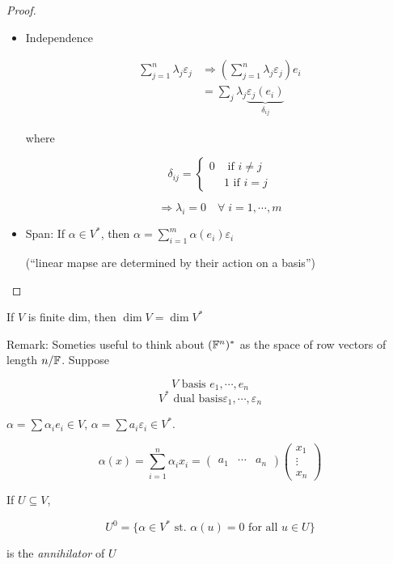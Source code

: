 \documentclass[a4paper]{article}
\begin{document}
\begin{proof}
\begin{itemize}
	\item Independence
	
	\begin{align*}
	\sum_{j=1}^{n} \lambda_{j} \varepsilon_{j} & \Rightarrow \left(  \sum_{j=1}^{n}  \lambda_{j} \varepsilon_{j} \right) e_{i}   \\
	& = \sum_{j} \lambda_{j} \underbrace{\varepsilon_{j} (e_{i})}_{\delta_{ij}} 
	\end{align*}
	
	where 
	
	\[ \delta_{ij} = \begin{cases} 0  & \text{ if } i \neq j \\ & 1 \text{ if } i = j\end{cases} \]
	
	
	\[ \Rightarrow  \lambda_{i} = 0 \quad \forall \; i = 1,\cdots,m \]
	
	\item Span: If $ \alpha \in V^{*} $, then $ \alpha = \sum_{i=1}^{m} \alpha(e_{i}) \varepsilon_{i} $
	
	(``linear mapse are determined by their action on a basis'')
	
\end{itemize}
\end{proof}

\begin{cor} 
	If $ V $ is finite dim, then $ \dim V  = \dim V^{*} $
\end{cor}
 
 
 Remark: Someties useful to think about $ (\mathbb{F}^{n})^{*} $ as the space of row vectors of length $ n / \mathbb{F} $. Suppose
 
 \[ V \text{ basis } e_{1},\cdots,e_{n}\]
 \[ V^{*} \text{ dual basis} \varepsilon_{1},\cdots,\varepsilon_{n} \]
 
 $ \alpha = \sum \alpha_{i} e_{i} \in V $, $ \alpha = \sum a_{i} \varepsilon_{i} \in V^{*} $.
 
 \[ \alpha(x) = \sum_{i=1}^{n} \alpha_{i} x_{i} =   \begin{pmatrix}
 a_{1} & \cdots & a_{n}
 \end{pmatrix}  \begin{pmatrix}
 x_{1} \\
 \vdots \\
 x_{n}
 \end{pmatrix}  \]
 
 
 \begin{defi}
 	If $ U \subseteq V $, 
 	
 	\[ U^{0} = \{  \alpha \in V^{*} \text{ st. } \alpha(u) = 0 \text{ for all }  u  \in U \} \] 
 	
 	is the \emph{annihilator} of $ U $
 	
 \end{defi}
\end{document}
